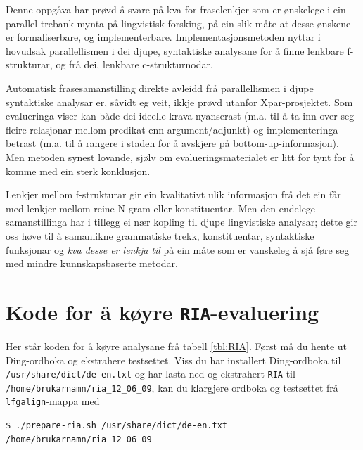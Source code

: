 \documentclass[12pt,a4paper,oneside,draft]{report}
\begin{document}
Denne oppgåva har prøvd å svare på kva for fraselenkjer som er
 ønskelege i ein parallel trebank mynta på lingvistisk forsking, på
 ein slik måte at desse ønskene er formaliserbare, og
 implementerbare. Implementasjonsmetoden nyttar i hovudsak
 parallellismen i dei djupe, syntaktiske analysane for å finne
 lenkbare f\hyp{}strukturar, og frå dei, lenkbare c\hyp{}strukturnodar.

Automatisk frasesamanstilling direkte avleidd frå parallellismen i
 djupe syntaktiske analysar er, såvidt eg veit, ikkje prøvd utanfor
 Xpar-prosjektet. Som evalueringa viser kan både dei ideelle krava
 nyanserast (m.a. til å ta inn over seg fleire relasjonar mellom
 predikat enn argument/adjunkt) og implementeringa betrast (m.a. til å
 rangere i staden for å avskjere på bottom-up-informasjon). Men metoden
 synest lovande, sjølv om evalueringsmaterialet er litt for tynt for å
 komme med ein sterk konklusjon.

Lenkjer mellom f\hyp{}strukturar gir ein kvalitativt ulik informasjon frå det ein
 får med lenkjer mellom reine N-gram eller konstituentar. Men den
 endelege samanstillinga har i tillegg ei nær kopling til djupe
 lingvistiske analysar; dette gir oss høve til å samanlikne
 grammatiske trekk, konstituentar, syntaktiske funksjonar og \emph{kva  desse er lenkja til} på ein måte som er vanskeleg å sjå føre seg med
 mindre kunnskapsbaserte metodar. 






\appendix

\chapter{Kode for å køyre \texttt{RIA}-evaluering}
\label{sec-7}

\label{SEC:ria-kode}

Her står koden for å køyre analysane frå tabell \ref{tbl:RIA}. Først
 må du hente ut Ding-ordboka og ekstrahere testsettet. Viss du har
 installert Ding-ordboka til \texttt{/usr/share/dict/de-en.txt} og har lasta
 ned og ekstrahert \texttt{RIA} til \texttt{/home/brukarnamn/ria\_12\_06\_09}, kan du
 klargjere ordboka og testsettet frå \texttt{lfgalign}-mappa med


\begin{verbatim}
$ ./prepare-ria.sh /usr/share/dict/de-en.txt /home/brukarnamn/ria_12_06_09
\end{verbatim}
\end{document}
